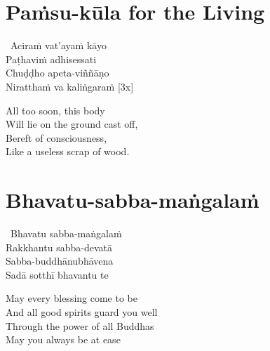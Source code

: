 \section{Paṁsu-kūla for the Living}
\label{pamsu-kula-living}

\vspace{-0.6em}

\begin{pali-hang}
\anglebracketleft\ \hspace{-0.5mm}Aciraṁ vat'ayaṁ kāyo \hspace{-0.5mm}\anglebracketright\ \\
Paṭhaviṁ adhisessati\\
Chuḍḍho apeta-viññāṇo\\
Niratthaṁ va kaliṅgaraṁ \hfill{[3x]}
\end{pali-hang}

\begin{english-verses}
  All too soon, this body\\
  Will lie on the ground cast off,\\
  Bereft of consciousness,\\
  Like a useless scrap of wood.
\end{english-verses}

\suttaRef{[Dhp 41]}

\section{Bhavatu-sabba-maṅgalaṁ}
\label{bhavatu}

\vspace{-0.8em}

\begin{pali-hang}
\anglebracketleft\ \hspace{-0.5mm}Bhavatu sabba-maṅgalaṁ \hspace{-0.5mm}\anglebracketright\ \\
Rakkhantu sabba-devatā\\
Sabba-buddhānubhāvena\\
Sadā sotthī bhavantu te
\end{pali-hang}

\begin{english-verses}
  May every blessing come to be\\
  And all good spirits guard you well\\
  Through the power of all Buddhas\\
  May you always be at ease
\end{english-verses}

